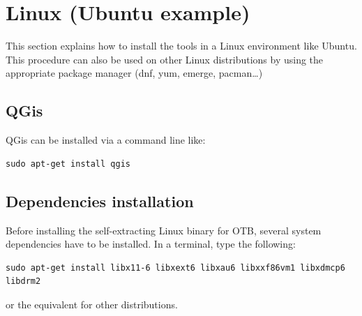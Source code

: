 \documentclass[10pt,a4paper]{article}
\begin{document}

\clearpage
\section{Linux (Ubuntu example)}

This section explains how to install the tools in a Linux environment like Ubuntu. This procedure can also be used on other Linux distributions by using the appropriate package manager (dnf, yum,
emerge, pacman\ldots)

\subsection{QGis}
QGis can be installed via a command line like:
\begin{verbatim}
sudo apt-get install qgis
\end{verbatim}

\subsection{Dependencies installation}
Before installing the self-extracting Linux binary for OTB, several system dependencies have to be installed. In a terminal, type the following:
\begin{verbatim}
sudo apt-get install libx11-6 libxext6 libxau6 libxxf86vm1 libxdmcp6 libdrm2
\end{verbatim}
or the equivalent for other distributions.
\end{document}
